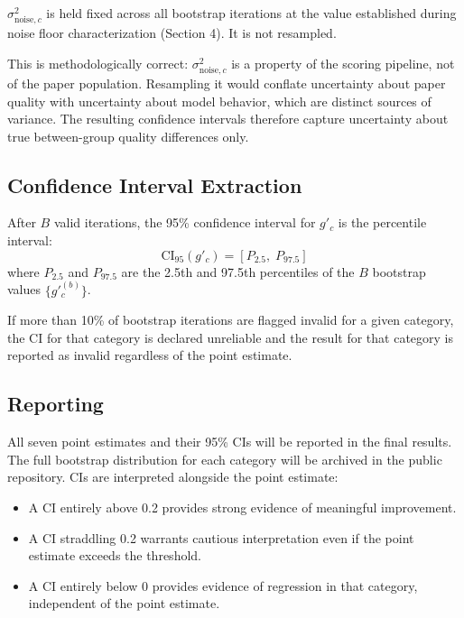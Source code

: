 \documentclass[11pt]{article}
\begin{document}
$\sigma^2_{\text{noise},c}$ is held fixed across all bootstrap iterations at the value established during noise floor characterization (Section 4). It is not resampled.

This is methodologically correct: $\sigma^2_{\text{noise},c}$ is a property of the scoring pipeline, not of the paper population. Resampling it would conflate uncertainty about paper quality with uncertainty about model behavior, which are distinct sources of variance. The resulting confidence intervals therefore capture uncertainty about true between-group quality differences only.

\subsection{Confidence Interval Extraction}

After $B$ valid iterations, the 95\% confidence interval for $g'_c$ is the percentile interval:
\begin{equation}
\text{CI}_{95}(g'_c) = \left[P_{2.5},\; P_{97.5}\right]
\end{equation}
where $P_{2.5}$ and $P_{97.5}$ are the 2.5th and 97.5th percentiles of the $B$ bootstrap values $\{g'^{(b)}_c\}$.

If more than 10\% of bootstrap iterations are flagged invalid for a given category, the CI for that category is declared unreliable and the result for that category is reported as invalid regardless of the point estimate.

\subsection{Reporting}

All seven point estimates and their 95\% CIs will be reported in the final results. The full bootstrap distribution for each category will be archived in the public repository. CIs are interpreted alongside the point estimate:

\begin{itemize}
    \item A CI entirely above 0.2 provides strong evidence of meaningful improvement.
    \item A CI straddling 0.2 warrants cautious interpretation even if the point estimate exceeds the threshold.
    \item A CI entirely below 0 provides evidence of regression in that category, independent of the point estimate.
\end{itemize}
\end{document}
